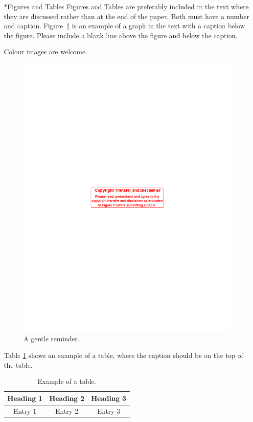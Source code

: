 \documentclass[twocolumn, a4paper,10pt]{article}
\makeatletter
\renewcommand\subsection{\@startsection{subsection}{1}{\z@}{0.2cm}{0.1cm}{\normalfont\normalsize\bfseries}}
\makeatother
\begin{document}
\subsection*{Figures and Tables}
Figures and Tables are preferably included in the text where they are discussed rather than at the end of the paper. Both must have a number and caption. Figure~\ref{fig:fig01} is an example of a graph in the text with a caption below the figure.  Please include a blank line above the figure and below the caption.

Colour images are welcome.

\begin{figure}
\centering
\includegraphics[scale=1.0]{img/fig1.pdf}
\caption{A gentle reminder.}
\label{fig:fig01}
\end{figure}

Table \ref{tab:tab01} shows an example of a table, where the caption should be on the top of the table.
\begin{table}
\caption{Example of a table.}
\label{tab:tab01}
\centering
\begin{tabular}{| c | c | c | }
  \hline
  \bf{Heading 1} & \bf{Heading} 2 & \bf{Heading 3} \\
  \hline
  Entry 1 & Entry 2 & Entry 3 \\
  \hline
\end{tabular}
\end{table}
\end{document}
